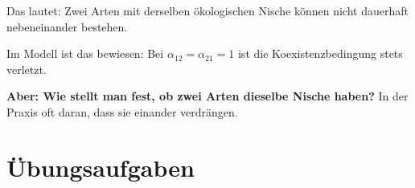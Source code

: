 \begin{warnung}
Das  lautet: Zwei Arten mit derselben ökologischen Nische können nicht dauerhaft nebeneinander bestehen.

Im Modell ist das bewiesen: Bei $\alpha_{12} = \alpha_{21} = 1$ ist die Koexistenzbedingung stets verletzt.

\begin{center}
\begin{minipage}{0.9\textwidth}
\textbf{Aber: Wie stellt man fest, ob zwei Arten dieselbe Nische haben?} In der Praxis oft daran, dass sie einander verdrängen.
\end{minipage}
\end{center}

\begin{center}
\begin{minipage}{0.88\textwidth}
\end{minipage}
\end{center}
\end{warnung}

\section{Übungsaufgaben}

